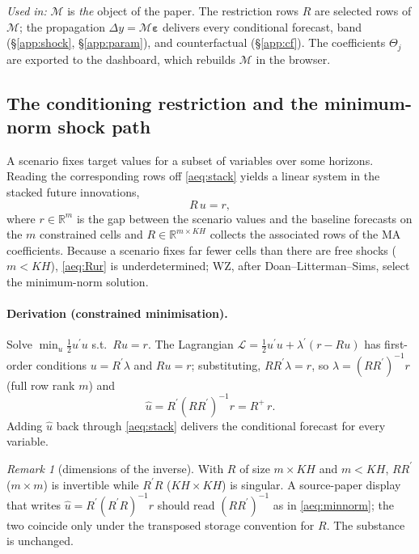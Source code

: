 \documentclass[11pt]{article}
\newcommand{\R}{\mathbb{R}}
\newcommand{\tp}{^{\prime}}
\newcommand{\beps}{\bm{\varepsilon}}
\newcommand{\Mmap}{\mathcal{M}}
\newcommand{\pinv}[1]{#1^{+}}
\theoremstyle{remark}
\newtheorem{remark}{Remark}
\begin{document}
\medskip
\noindent\textit{Used in:} $\Mmap$ is \emph{the} object of the paper. The
restriction rows $R$ are selected rows of $\Mmap$; the propagation
$\Delta y=\Mmap\beps$ delivers every conditional forecast, band
(\S\ref{app:shock}, \S\ref{app:param}), and counterfactual (\S\ref{app:cf}). The
coefficients $\Theta_j$ are exported to the dashboard, which rebuilds $\Mmap$ in
the browser.

\subsection{The conditioning restriction and the minimum-norm shock path}\label{app:minnorm}
A scenario fixes target values for a subset of variables over some horizons.
Reading the corresponding rows off \eqref{aeq:stack} yields a linear system in the
stacked future innovations,
\begin{equation}
R\,u=r,
\tag{5$''$}\label{aeq:Rur}
\end{equation}
where $r\in\R^{m}$ is the gap between the scenario values and the baseline
forecasts on the $m$ constrained cells and $R\in\R^{m\times KH}$ collects the
associated rows of the MA coefficients. Because a scenario fixes far fewer cells
than there are free shocks ($m<KH$), \eqref{aeq:Rur} is underdetermined; WZ, after
Doan--Litterman--Sims, select the minimum-norm solution.

\paragraph{Derivation (constrained minimisation).} Solve
$\min_u\tfrac12u\tp u$ s.t.\ $Ru=r$. The Lagrangian
$\mathcal L=\tfrac12u\tp u+\lambda\tp(r-Ru)$ has first-order conditions
$u=R\tp\lambda$ and $Ru=r$; substituting, $RR\tp\lambda=r$, so
$\lambda=(RR\tp)^{-1}r$ (full row rank $m$) and
\begin{equation}
\hat u=R\tp(RR\tp)^{-1}r=\pinv{R}\,r.
\tag{5$'''$}\label{aeq:minnorm}
\end{equation}
Adding $\hat u$ back through \eqref{aeq:stack} delivers the conditional forecast
for every variable.

\begin{remark}[dimensions of the inverse]
With $R$ of size $m\times KH$ and $m<KH$, $RR\tp$ ($m\times m$) is invertible
while $R\tp R$ ($KH\times KH$) is singular. A source-paper display that writes
$\hat u=R\tp(R\tp R)^{-1}r$ should read $(RR\tp)^{-1}$ as in \eqref{aeq:minnorm};
the two coincide only under the transposed storage convention for $R$. The
substance is unchanged.
\end{remark}
\end{document}
